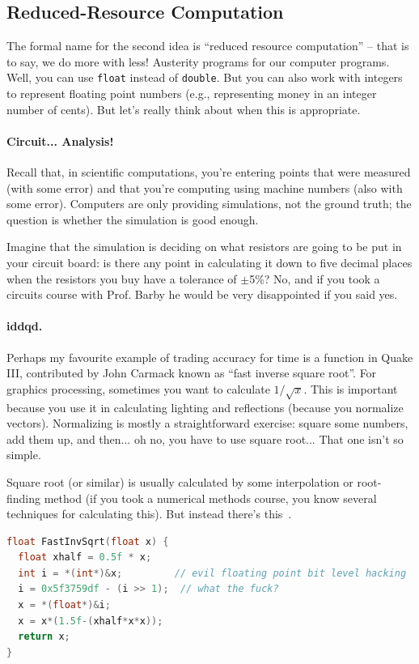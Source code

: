 \documentclass[a4paper]{report}
\begin{document}
\subsection*{Reduced-Resource Computation}

The formal name for the second idea is ``reduced resource computation'' -- that is to say, we do more with less! Austerity programs for our computer programs. Well, you can use \texttt{float} instead of \texttt{double}. But you can also work with integers to represent floating point numbers (e.g., representing money in an integer number of cents). But let's really  think about when this is appropriate.

\paragraph{Circuit... Analysis!} Recall that, in scientific computations, you're entering points that were measured (with some error) and that you're computing using machine numbers (also with some error). Computers are only providing simulations, not the ground truth; the question is whether the simulation is good enough.

Imagine that the simulation is deciding on what resistors are going to be put in your circuit board: is there any point in calculating it down to five decimal places when the resistors you buy have a tolerance of $\pm$5\%? No, and if you took a circuits course with Prof. Barby he would be very disappointed if you said yes.


\paragraph{iddqd.} Perhaps my favourite example of trading accuracy for time is a function in Quake III, contributed by John Carmack known as ``fast inverse square root''. For graphics processing, sometimes you want to calculate $1/\sqrt{x}$. This is important because you use it in calculating lighting and reflections (because you normalize vectors). Normalizing is mostly a straightforward exercise: square some numbers, add them up, and then... oh no, you have to use square root... That one isn't so simple.

Square root (or similar) is usually calculated by some interpolation or root-finding method (if you took a numerical methods course, you know several techniques for calculating this). But instead there's this~\cite{fisqrt}. 

\begin{lstlisting}[language=C]
float FastInvSqrt(float x) {
  float xhalf = 0.5f * x;
  int i = *(int*)&x;         // evil floating point bit level hacking
  i = 0x5f3759df - (i >> 1);  // what the fuck?
  x = *(float*)&i;
  x = x*(1.5f-(xhalf*x*x));
  return x;
}
\end{lstlisting}
\end{document}
